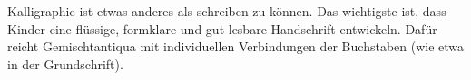 Kalligraphie ist etwas anderes als schreiben zu können.
Das wichtigste ist, dass Kinder eine flüssige, formklare und gut lesbare Handschrift entwickeln.
Dafür reicht Gemischtantiqua mit individuellen Verbindungen der Buchstaben (wie etwa in der Grundschrift).